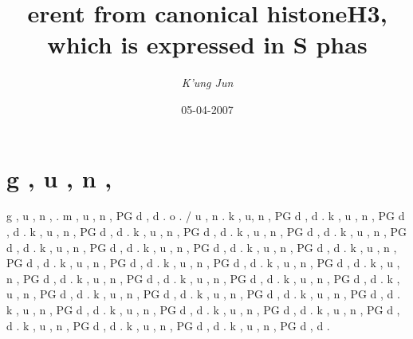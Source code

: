 \documentclass{article}%
\title{erent from canonical histoneH3, which is expressed in S phas}%
\author{\textit{K'ung Jun}}%
\date{05-04-2007}%
\begin{document}
%
\normalsize%
\maketitle%
\section{g , u , n ,  }%
\label{sec:g,u,n,}%
g , u , n ,  .\newline%
m , u , n , PG d , d .\newline%
 o . / u , n  .\newline%
k , u, n , PG d , d .\newline%
k , u , n , PG d , d .\newline%
k , u , n , PG d , d .\newline%
k , u , n , PG d , d .\newline%
k , u , n , PG d , d .\newline%
k , u , n , PG d , d .\newline%
k , u , n , PG d , d .\newline%
k , u , n , PG d , d .\newline%
k , u , n , PG d , d .\newline%
k , u , n , PG d , d .\newline%
k , u , n , PG d , d .\newline%
k , u , n , PG d , d .\newline%
k , u , n , PG d , d .\newline%
k , u , n , PG d , d .\newline%
k , u , n , PG d , d .\newline%
k , u , n , PG d , d .\newline%
k , u , n , PG d , d .\newline%
k , u , n , PG d , d .\newline%
k , u , n , PG d , d .\newline%
k , u , n , PG d , d .\newline%
k , u , n , PG d , d .\newline%
k , u , n , PG d , d .\newline%
k , u , n , PG d , d .\newline%
k , u , n , PG d , d .\newline%
k , u , n , PG d , d .\newline%
k , u , n , PG d , d .\newline%
k , u , n , PG d , d .\newline%
k , u , n , PG d , d .\newline%
\end{document}
